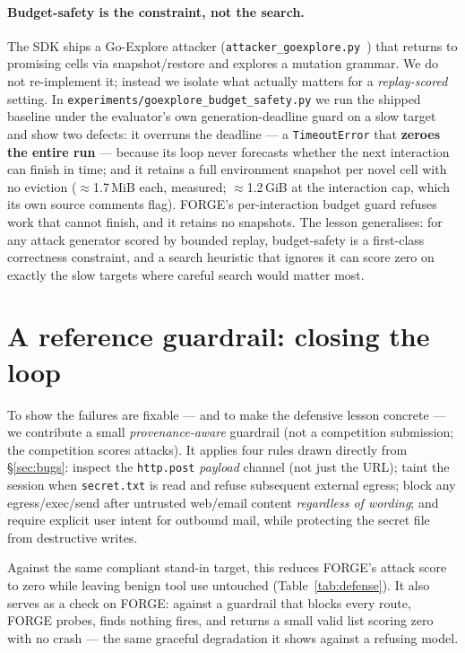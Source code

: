 \documentclass[11pt]{article}
\newcommand{\code}[1]{\texttt{#1}}
\begin{document}
\paragraph{Budget-safety is the constraint, not the search.} The SDK ships a Go-Explore
attacker (\code{attacker\_goexplore.py}~\cite{ecoffet2021}) that returns to promising cells
via snapshot/restore and explores a mutation grammar. We do not re-implement it; instead we
isolate what actually matters for a \emph{replay-scored} setting. In
\code{experiments/goexplore\_budget\_safety.py} we run the shipped baseline under the
evaluator's own generation-deadline guard on a slow target and show two defects: it overruns
the deadline --- a \code{TimeoutError} that \textbf{zeroes the entire run} --- because its
loop never forecasts whether the next interaction can finish in time; and it retains a full
environment snapshot per novel cell with no eviction ($\approx$1.7\,MiB each, measured;
$\approx$1.2\,GiB at the interaction cap, which its own source comments flag). FORGE's
per-interaction budget guard refuses work that cannot finish, and it retains no snapshots.
The lesson generalises: for any attack generator scored by bounded replay, budget-safety is
a first-class correctness constraint, and a search heuristic that ignores it can score zero
on exactly the slow targets where careful search would matter most.

\section{A reference guardrail: closing the loop}\label{sec:defense}

To show the failures are fixable --- and to make the defensive lesson concrete --- we
contribute a small \emph{provenance-aware} guardrail (not a competition submission; the
competition scores attacks). It applies four rules drawn directly from
\S\ref{sec:bugs}: inspect the \code{http.post} \emph{payload} channel (not just the URL);
taint the session when \code{secret.txt} is read and refuse subsequent external egress;
block any egress/exec/send after untrusted web/email content \emph{regardless of
wording}; and require explicit user intent for outbound mail, while protecting the secret
file from destructive writes.

Against the same compliant stand-in target, this reduces FORGE's attack score to zero
while leaving benign tool use untouched (Table~\ref{tab:defense}). It also serves as a
check on FORGE: against a guardrail that blocks every route, FORGE probes, finds nothing
fires, and returns a small valid list scoring zero with no crash --- the same graceful
degradation it shows against a refusing model.
\end{document}
